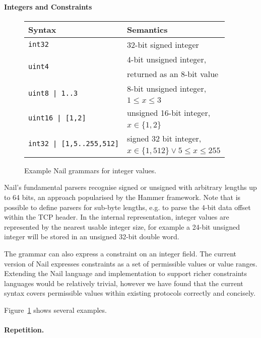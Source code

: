 \paragraph{Integers and Constraints}
\begin{figure}[tb]
\begin{tabular}{ll}
\toprule
\bf Syntax & \bf Semantics \\
\midrule
\texttt{int32} & 32-bit signed integer \\
\multirow{2}{*}{\texttt{uint4}}
  & 4-bit unsigned integer, \\
  & returned as an 8-bit value \\
\multirow{2}{*}{\texttt{uint8 | 1..3}}
  & 8-bit unsigned integer, \\
  & $1\leq x \leq 3$ \\
\multirow{2}{*}{\texttt{uint16 | [1,2]}}
  & unsigned 16-bit integer, \\
  & $x \in \{1,2\}$ \\
\multirow{2}{*}{\texttt{int32 | [1,5..255,512]}}
  & signed 32 bit integer, \\
  & $x \in \{ 1, 512 \} \vee 5\leq x\leq 255$ \\
\bottomrule
\end{tabular}
\caption{Example Nail grammars for integer values.}
\label{fig:range}
\end{figure}

Nail's fundamental parsers recognise signed or unsigned with arbitrary lengths up to 64 bits, an
approach popularised by the Hammer framework.\cite{hammer-parser}  
Note that is possible to define parsers for sub-byte lengths, e.g. to parse the 4-bit
data offset within the TCP header.  In the internal representation, integer values are represented
by the nearest usable integer size, for example a 24-bit unsigned integer will be stored in an
unsigned 32-bit double word.

The grammar can also express a constraint on an integer field. The current version of Nail expresses
constraints as a set of permissible values or value ranges. Extending the Nail language and
implementation to support richer constraints languages would be relatively trivial, however we have
found that the current syntax covers permissible values within existing protocols correctly and
concisely.

Figure~\ref{fig:range} shows several examples.

\paragraph{Repetition.}

